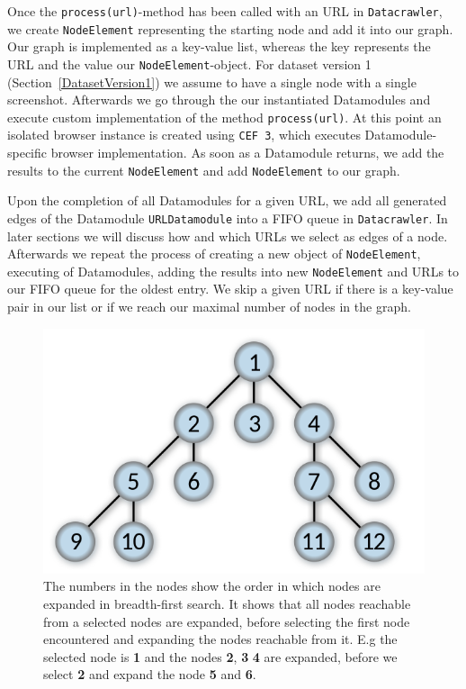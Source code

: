 Once the \texttt{process(url)}-method has been called with an URL in \texttt{Datacrawler}, we create \texttt{NodeElement} representing the starting node and add it into our graph. Our graph is implemented as a key-value list, whereas the key represents the URL and the value our \texttt{NodeElement}-object. For dataset version 1 (Section~\ref{DatasetVersion1}) we assume to have a single node with a single screenshot. Afterwards we go through the our instantiated Datamodules and execute custom implementation of the method \texttt{process(url)}. At this point an isolated browser instance is created using \texttt{CEF 3}, which executes Datamodule-specific browser implementation. As soon as a Datamodule returns, we add the results to the current \texttt{NodeElement} and add \texttt{NodeElement} to our graph. 

Upon the completion of all Datamodules for a given URL, we add all generated edges of the Datamodule \texttt{URLDatamodule} into a FIFO queue in \texttt{Datacrawler}. In later sections we will discuss how and which URLs we select as edges of a node. Afterwards we repeat the process of creating a new object of \texttt{NodeElement}, executing of Datamodules, adding the results into new \texttt{NodeElement} and URLs to our FIFO queue for the oldest entry. We skip a given URL if there is a key-value pair in our list or if we reach our maximal number of nodes in the graph.

\begin{figure}
	\centering
	\includegraphics[scale=0.35]{resources/breadth-first}
	\caption[Illustration of the breadth-first search algorithm]{The numbers in the nodes show the order in which nodes are expanded in breadth-first search. It shows that all nodes reachable from a selected nodes are expanded, before selecting the first node encountered and expanding the nodes reachable from it. E.g the selected node is \textbf{1} and the nodes \textbf{2}, \textbf{3} \textbf{4} are expanded, before we select \textbf{2} and expand the node \textbf{5} and \textbf{6}.}
	\label{datacrawler_breadth_search}
\end{figure}


